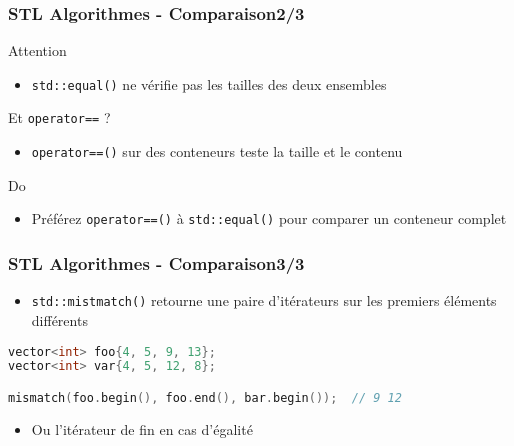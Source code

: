 \documentclass[C++.tex]{subfiles}
\begin{document}
\begin{frame}[fragile]
	\frametitle{STL Algorithmes - Comparaison\titlehfill{}2/3}
	\begin{alertblock}{Attention}
		\begin{itemize}
			\item \lstinline|std::equal()| ne vérifie pas les tailles des deux ensembles
		\end{itemize}
	\end{alertblock}


	\begin{block}{Et \lstinline|operator==| ?}
		\begin{itemize}
			\item \lstinline|operator==()| sur des conteneurs teste la taille et le contenu
		\end{itemize}
	\end{block}

	\begin{exampleblock}{Do}
		\begin{itemize}
			\item Préférez \lstinline|operator==()| à \lstinline|std::equal()| pour comparer un conteneur complet
		\end{itemize}
	\end{exampleblock}
\end{frame}

\begin{frame}[fragile]
	\frametitle{STL Algorithmes - Comparaison\titlehfill{}3/3}
	\begin{itemize}
		\item \lstinline|std::mistmatch()| retourne une paire d'itérateurs sur les premiers éléments différents
	\end{itemize}

	\begin{lstlisting}[language=C++]
vector<int> foo{4, 5, 9, 13};
vector<int> var{4, 5, 12, 8};

mismatch(foo.begin(), foo.end(), bar.begin());  // 9 12\end{lstlisting}

	\begin{itemize}
		\item Ou l'itérateur de fin en cas d'égalité
	\end{itemize}
\end{frame}
\end{document}
